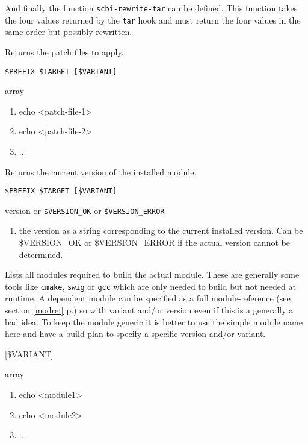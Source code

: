 \documentclass[a4paper,12pt,twoside]{article}
\newcommand{\code}[1]{\texttt{#1}}
\newcommand{\seeref}[1]{see section \ref{#1} p.\pageref{#1}}
\begin{document}
\begin{description}[font=\large\texttt]
	And finally the function \code{scbi-rewrite-tar} can be defined. This function takes the four values returned by the \code{tar} hook and must return the four values in the same order but possibly rewritten.

	\item[<module>-patches] Returns the patch files to apply.

	\begin{description}[font=\textit,style=standard]
		\item[parameter] \tabto{2cm} \code{\$PREFIX \$TARGET [\$VARIANT]}
		\item[return] \tabto{2cm} array
		\begin{enumerate}
			\item echo <patch-file-1>
			\item echo <patch-file-2>
			\item ...
		\end{enumerate}
	\end{description}

	\item[<module>-version] Returns the current version of the installed module.

	\begin{description}[font=\textit,style=standard]
		\item[parameter] \tabto{2cm} \code{\$PREFIX \$TARGET [\$VARIANT]}
		\item[return] \tabto{2cm} version or \code{\$VERSION\_OK} or \code{\$VERSION\_ERROR}
		\begin{enumerate}
			\item the version as a string corresponding to the current installed version. Can be \$VERSION\_OK or \$VERSION\_ERROR if the actual version cannot be determined.
		\end{enumerate}
	\end{description}

	\item[<module>-build-depends] Lists all modules required to build the actual module. These are generally some tools like \code{cmake}, \code{swig} or \code{gcc} which are only needed to build but not needed at runtime. A dependent module can be specified as a full module-reference (\seeref{modref}) so with variant and/or version even if this is a generally a bad idea. To keep the module generic it is better to use the simple module name here and have a build-plan to specify a specific version and/or variant.

	\begin{description}[font=\textit,style=standard]
		\item[parameter] \tabto{2cm} [\$VARIANT]
		\item[return] \tabto{2cm} array
		\begin{enumerate}
			\item echo <module1>
			\item echo <module2>
			\item ...
		\end{enumerate}
	\end{description}


\end{description}
\end{document}
